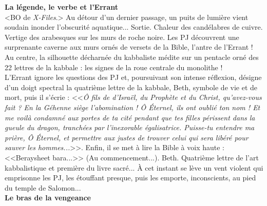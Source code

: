 \documentclass[11pt,twoside,a4paper]{book}
\begin{document}
\textbf{\large La l{\'e}gende, le verbe et l'Errant}~\\

<BO de \emph{X-Files}.> Au d{\'e}tour d'un dernier passage, un puits de lumi{\`e}re vient soudain inonder l'obscurit{\'e} aquatique... Sortie. Chaleur des cand{\'e}labres de cuivre. Vertige des arabesques sur les murs de roche noire. Les PJ d{\'e}couvrent une surprenante caverne aux murs orn{\'e}s de versets de la Bible, l'antre de l'Errant ! Au centre, la silhouette d{\'e}charn{\'e}e du kabbaliste m{\'e}dite sur un pentacle orn{\'e} des 22 lettres de la kabbale : les signes de la roue centrale du monolithe !~\\


L'Errant ignore les questions des PJ et, poursuivant son intense r{\'e}flexion, d{\'e}signe d'un doigt spectral la quatri{\`e}me lettre de la kabbale, Beth, symbole de vie et de mort, puis il s'{\'e}crie : <<\emph{{\^O} fils de d'Isra{\"e}l, du Proph{\`e}te et du Christ, qu'avez-vous fait ? En la G{\'e}henne si{\`e}ge l'abomination ! {\^O} {\'E}ternel, ils ont oubli{\'e} ton nom ! Et me voil{\`a} condamn{\'e} aux portes de ta cit{\'e} pendant que tes filles p{\'e}rissent dans la gueule du dragon, tranch{\'e}es par l'inexorable {\'e}galisatrice. Puisse-tu entendre ma pri{\`e}re, {\^O} {\'E}ternel, et permettre aux justes de trouver celui qui sera lib{\'e}r{\'e} pour sauver les hommes...}>>. Enfin, il se met {\`a} lire la Bible {\`a} voix haute : <<Beraysheet bara...>> (Au commencement...). Beth. Quatri{\`e}me lettre de l'art kabbalistique et premi{\`e}re du livre sacr{\'e}... {\`A} cet instant se l{\`e}ve un vent violent qui emprisonne les PJ, les {\'e}touffant presque, puis les emporte, inconscients, au pied du temple de Salomon...~\\

\textbf{\large Le bras de la vengeance}~\\
\end{document}
